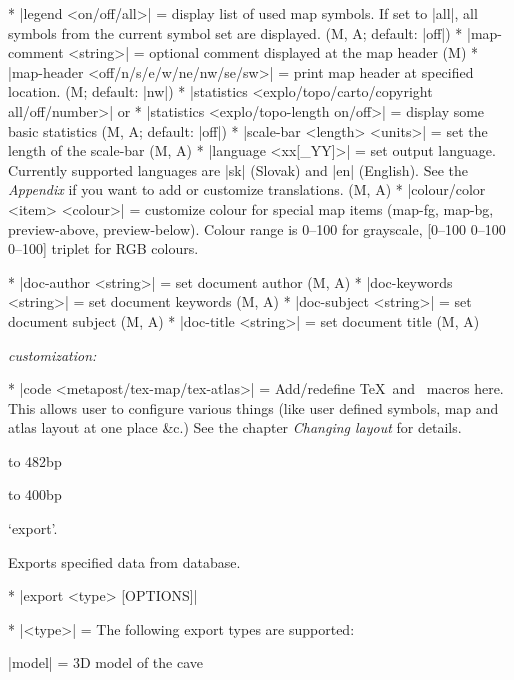   * |legend <on/off/all>| = display list of used map symbols. If set to
    |all|, all symbols from the current symbol set are displayed. 
    (M, A; default: |off|)
  * |map-comment <string>| = optional comment displayed at the map header (M)
  * |map-header <off/n/s/e/w/ne/nw/se/sw>| = print map header at specified
    location. (M; default: |nw|)
  * |statistics <explo/topo/carto/copyright all/off/number>| or 
  * |statistics <explo/topo-length on/off>| = display some basic 
    statistics (M, A; default: |off|)
  * |scale-bar <length> <units>| = set the length of the scale-bar (M, A)
  * |language <xx[_YY]>| = set output language. Currently supported languages are
    |sk| (Slovak) and |en| (English). See the {\it Appendix} if you want to 
    add or customize translations. (M, A)
  * |colour/color <item> <colour>| = customize colour for special map
    items (map-fg, map-bg, preview-above, preview-below). 
    Colour range is 0--100 for grayscale, [0--100 0--100 0--100] triplet
    for RGB colours.


  * |doc-author <string>| = set document author (M, A)
  * |doc-keywords <string>| = set document keywords (M, A)
  * |doc-subject <string>| = set document subject (M, A)
  * |doc-title <string>| = set document title (M, A)

  {\it customization:}

  * |code <metapost/tex-map/tex-atlas>| = Add/redefine \TeX\ and \MP\
    macros here. This allows user to configure various things 
    (like user defined symbols, map and atlas layout at one place \&c.)
    See the chapter {\it Changing layout} for details.
\endcomopt

\midinsert
  \ifx\pdfoutput\undefined\else
  \fi
  \vbox to 482bp{\centerline{\hbox to 400bp{%
    \ifx\pdfoutput\undefined
    \else
      \rlap{\pdfrefximage\pdflastximage}%
    \fi
    \hss}}\vss
  }
\endinsert


\subsubchapter `export'.

\description
  Exports specified data from database. 
\enddescription

\syntax
  \list
    * |export <type> [OPTIONS]| 
  \endlist
\endsyntax

\arguments
  * |<type>| = The following export types are supported:

    |model| = 3D model of the cave

